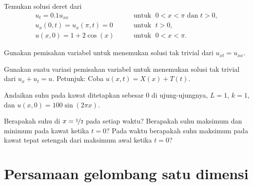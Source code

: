 \begin{exercise}
Temukan solusi deret dari
\begin{equation*}
\begin{array}{ll}
u_t =  0.1 u_{xx} & \qquad \text{untuk } \; 0 < x < \pi \text{ dan } t > 0, \\
u_x(0,t) = u_x(\pi,t) = 0 &  \qquad \text{untuk } \; t > 0, \\
u(x,0) = 1 + 2\cos (x) & \qquad \text{untuk } \; 0 < x < \pi .
\end{array}
\end{equation*}
\end{exercise}

\begin{exercise}
Gunakan pemisahan variabel untuk menemukan solusi tak trivial dari
$u_{xt} = u_{xx}$.
\end{exercise}

\begin{exercise}
Gunakan suatu variasi pemisahan variabel 
untuk menemukan solusi tak trivial dari
$u_{x} + u_{t} = u$.  Petunjuk: Coba $u(x,t) = X(x)+T(t)$.
\end{exercise}

\begin{exercise}
Andaikan suhu pada kawat ditetapkan sebesar $0$
di ujung-ujungnya, $L=1$, $k=1$, dan $u(x,0) = 100\sin(2 \pi x)$.
\begin{tasks}
\task
Berapakah suhu di $x = \nicefrac{1}{2}$ pada setiap waktu?
\task
Berapakah suhu maksimum dan minimum pada kawat
ketika $t=0$?
\task
Pada waktu berapakah suhu maksimum pada kawat tepat
setengah dari maksimum awal ketika $t=0$?
\end{tasks}
\end{exercise}


\sectionnewpage
\section{Persamaan gelombang satu dimensi} \label{we:section}



